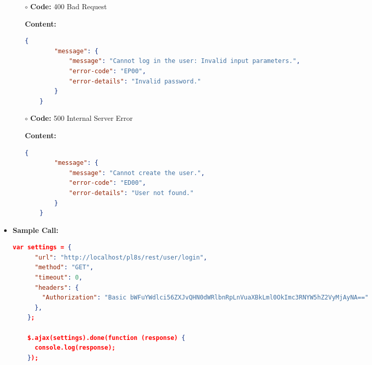 \begin{itemize}
\begin{itemize}
			\item[$\circ$] \textbf{Code:} 400 Bad Request
			\item[] \textbf{Content:}
			\begin{lstlisting}[language=json]
    {
        "message": {
            "message": "Cannot log in the user: Invalid input parameters.",
            "error-code": "EP00",
            "error-details": "Invalid password."
        }
    }
			\end{lstlisting}
			
			\item[$\circ$] \textbf{Code:} 500 Internal Server Error
			\item[] \textbf{Content:}
			\begin{lstlisting}[language=json]
    {
        "message": {
            "message": "Cannot create the user.",
            "error-code": "ED00",
            "error-details": "User not found."
        }
    }
			\end{lstlisting}			
		\end{itemize}
	\item \textbf{Sample Call:}
	\begin{lstlisting}[language=json]
    var settings = {
      "url": "http://localhost/pl8s/rest/user/login",
      "method": "GET",
      "timeout": 0,
      "headers": {
        "Authorization": "Basic bWFuYWdlci56ZXJvQHN0dWRlbnRpLnVuaXBkLml0OkImc3RNYW5hZ2VyMjAyNA=="
      },
    };

    $.ajax(settings).done(function (response) {
      console.log(response);
    });
	\end{lstlisting}
	
\end{itemize}
